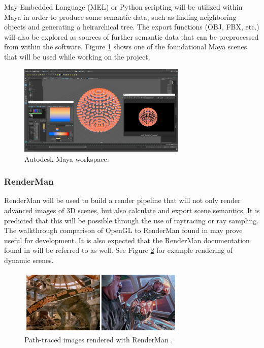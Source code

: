 \documentclass[conference]{IEEEtran}
\begin{document}
May Embedded Language (MEL) or Python scripting
will be utilized within Maya in order to produce some semantic data, such as finding neighboring
objects and generating a heirarchical tree. The export functions (OBJ, FBX, etc.) will also be explored
as sources of further semantic data that can be preprocessed from within the software.
Figure \ref{fig:maya} shows one of the foundational Maya scenes that will be used
while working on the project.

\begin{figure}[htbp]
\centerline{\includegraphics[width=8cm]{maya.png}}
\caption{Autodesk Maya workspace.}
\label{fig:maya}
\end{figure}

\subsubsection{RenderMan}
RenderMan will be used to build a render pipeline that will not only render advanced images
of 3D scenes, but also calculate and export scene semantics.
It is predicted that this will be possible through the use of raytracing or ray sampling.
The walkthrough comparison of OpenGL to RenderMan found in \cite{renderman_opengl}
may prove useful for development.
It is also expected that the RenderMan documentation found in \cite{renderman_docs}
will be referred to as well.
See Figure \ref{fig:renderman} for example rendering of dynamic scenes.

\begin{figure}[htbp]
\centerline{\includegraphics[width=8cm]{renderman.png}}
\caption{Path-traced images rendered with RenderMan \cite{renderman}.}
\label{fig:renderman}
\end{figure}
\end{document}
